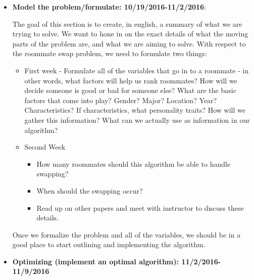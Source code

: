 \documentclass[12pt]{article}
\begin{document}
\begin{itemize}
\item \textbf{Model the problem/formulate: 10/19/2016-11/2/2016}:

The goal of this section is to create, in english, a summary of what we are trying to solve. We want to hone in on the exact details of what the moving parts of the problem are, and what we are aiming to solve. With respect to the roommate swap problem, we need to formulate two things:
\begin{itemize}
\item First week - Formulate all of the variables that go in to a roommate - in other words, what factors will help us rank roommates? How will we decide someone is good or bad for someone else? What are the basic factors that come into play? Gender? Major? Location? Year? Characteristics? If characteristics, what personality traits? How will we gather this information? What can we actually use as information in our algorithm?
\item Second Week 
\begin{itemize}
\item How many roommates should this algorithm be able to handle swapping? 
\item When should the swapping occur? 
\item Read up on other papers and meet with instructor to discuss these details. 
\end{itemize}
\end{itemize}
Once we formalize the problem and all of the variables, we should be in a good place to start outlining and implementing the algorithm.
\item \textbf{Optimizing (implement an optimal algorithm): 11/2/2016-11/9/2016} 


\end{itemize}
\end{document}
